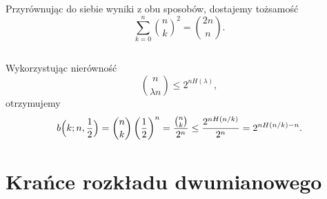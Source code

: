 Przyrównując do siebie wyniki z obu sposobów, dostajemy tożsamość
\[
	\sum_{k=0}^n\binom{n}{k}^2 = \binom{2n}{n}.
\]

\subsection{} %
Wykorzystując nierówność
\[
	\binom{n}{\lambda n} \le 2^{nH(\lambda)},
\]
otrzymujemy
\[
	b\Bigl(k;n,\frac{1}{2}\Bigr) = \binom{n}{k}\left(\frac{1}{2}\right)^n = \frac{\binom{n}{k}}{2^n} \le \frac{2^{nH(n/k)}}{2^n} = 2^{nH(n/k)-n}.
\]

\subsection{} %

\subsection{} %

\section{Krańce rozkładu dwumianowego}


